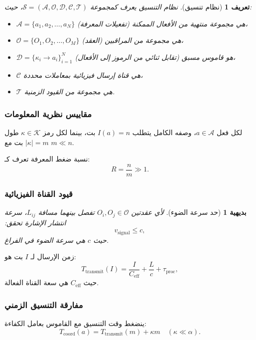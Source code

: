 \documentclass[11pt,a4paper]{article}
\newtheorem{axiom}{بديهية}
\newtheorem{definition}{تعريف}
\begin{document}
	\begin{definition}[نظام تنسيق]
		نظام التنسيق يعرف كمجموعة $\mathcal{S} = (\mathcal{A}, \mathcal{O}, \mathcal{D}, \mathcal{C}, \mathcal{T})$، حيث:
		\begin{itemize}
			\item $\mathcal{A} = \{a_1, a_2, \dots, a_N\}$ هي مجموعة منتهية من الأفعال الممكنة (تفعيلات المعرفة)،
			\item $\mathcal{O} = \{O_1, O_2, \dots, O_M\}$ هي مجموعة من المراقبين (العقد)،
			\item $\mathcal{D} = \{\kappa_i \to a_i\}_{i=1}^N$ هو قاموس مسبق (تقابل ثنائي من الرموز إلى الأفعال)،
			\item $\mathcal{C}$ هي قناة إرسال فيزيائية بمعاملات محددة،
			\item $\mathcal{T}$ هي مجموعة من القيود الزمنية.
		\end{itemize}
	\end{definition}
	
	\subsubsection{مقاييس نظرية المعلومات}
	لكل فعل $a \in \mathcal{A}$، وصفه الكامل يتطلب $I(a) = n$ بت، بينما لكل رمز $\kappa \in \mathcal{K}$ طول $|\kappa| = m$ بت مع $m \ll n$.
	
	نسبة ضغط المعرفة تعرف كـ:
	\[
	R = \frac{n}{m} \gg 1.
	\]
	
	\subsubsection{قيود القناة الفيزيائية}
	\begin{axiom}[حد سرعة الضوء]
		لأي عقدتين $O_i, O_j \in \mathcal{O}$ تفصل بينهما مسافة $L_{ij}$، سرعة انتشار الإشارة تحقق:
		\[
		v_{\text{signal}} \leq c,
		\]
		حيث $c$ هي سرعة الضوء في الفراغ.
	\end{axiom}
	
	زمن الإرسال لـ $I$ بت هو:
	\[
	T_{\text{transmit}}(I) = \frac{I}{C_{\text{eff}}} + \frac{L}{c} + \tau_{\text{proc}},
	\]
	حيث $C_{\text{eff}}$ هي سعة القناة الفعالة.
	
	\subsubsection{مفارقة التنسيق الزمني}
	ينضغط وقت التنسيق مع القاموس بعامل الكفاءة:
	\[
	T_{\text{coord}}(a) = T_{\text{transmit}}(m) + \kappa m \quad (\kappa \ll \alpha).
	\]
	
\end{document}
